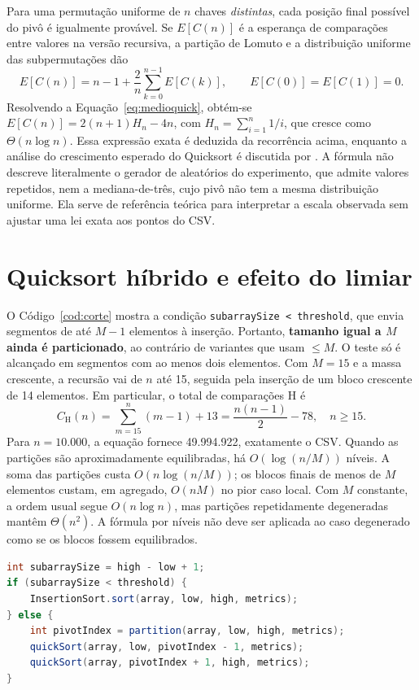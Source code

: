 Para uma permutação uniforme de $n$ chaves \emph{distintas}, cada posição final possível do pivô é igualmente provável. Se $E[C(n)]$ é a esperança de comparações entre valores na versão recursiva, a partição de Lomuto e a distribuição uniforme das subpermutações dão
\begin{equation}
 E[C(n)]=n-1+\frac{2}{n}\sum_{k=0}^{n-1}E[C(k)],\qquad E[C(0)]=E[C(1)]=0.
 \label{eq:medioquick}
\end{equation}
Resolvendo a Equação~\ref{eq:medioquick}, obtém-se $E[C(n)]=2(n+1)H_n-4n$, com $H_n=\sum_{i=1}^{n}1/i$, que cresce como $\Theta(n\log n)$. Essa expressão exata é deduzida da recorrência acima, enquanto a análise do crescimento esperado do Quicksort é discutida por . A fórmula não descreve literalmente o gerador de aleatórios do experimento, que admite valores repetidos, nem a mediana-de-três, cujo pivô não tem a mesma distribuição uniforme. Ela serve de referência teórica para interpretar a escala observada sem ajustar uma lei exata aos pontos do CSV.

\section{Quicksort híbrido e efeito do limiar}

O Código~\ref{cod:corte} mostra a condição \texttt{subarraySize < threshold}, que envia segmentos de até $M-1$ elementos à inserção. Portanto, \textbf{tamanho igual a $M$ ainda é particionado}, ao contrário de variantes que usam $\leq M$. O teste só é alcançado em segmentos com ao menos dois elementos. Com $M=15$ e a massa crescente, a recursão vai de $n$ até 15, seguida pela inserção de um bloco crescente de 14 elementos. Em particular, o total de comparações H é
\begin{equation}
 C_{\mathrm{H}}(n)=\sum_{m=15}^{n}(m-1)+13
 =\frac{n(n-1)}{2}-78,\quad n\geq15.
 \label{eq:hibridocrescente}
\end{equation}
Para $n=10.000$, a equação fornece 49.994.922, exatamente o CSV. Quando as partições são aproximadamente equilibradas, há $O(\log(n/M))$ níveis. A soma das partições custa $O(n\log(n/M))$; os blocos finais de menos de $M$ elementos custam, em agregado, $O(nM)$ no pior caso local. Com $M$ constante, a ordem usual segue $O(n\log n)$, mas partições repetidamente degeneradas mantêm $\Theta(n^2)$. A fórmula por níveis não deve ser aplicada ao caso degenerado como se os blocos fossem equilibrados.

\begin{lstlisting}[language=Java,caption={Condição de corte em HybridQuickSort.java},label={cod:corte}]
int subarraySize = high - low + 1;
if (subarraySize < threshold) {
    InsertionSort.sort(array, low, high, metrics);
} else {
    int pivotIndex = partition(array, low, high, metrics);
    quickSort(array, low, pivotIndex - 1, metrics);
    quickSort(array, pivotIndex + 1, high, metrics);
}
\end{lstlisting}

